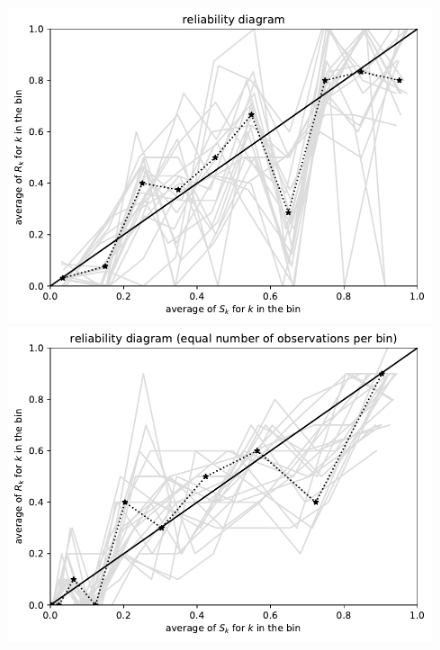 \documentclass{article}
\begin{document}
\begin{figure}
\begin{centering}
\vspace{\vertsep}

\parbox{\imsize}{\includegraphics[width=\imsize]
                {./codes/unweighted/100_10_1_3/equiprob.pdf}}
\quad\quad
\parbox{\imsize}{\includegraphics[width=\imsize]
                {./codes/unweighted/100_10_1_3/equisamp.pdf}}

\vspace{\vertsep}


\end{centering}
\end{figure}
\end{document}

